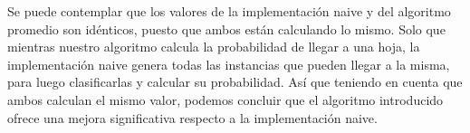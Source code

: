 Se puede contemplar que los valores de la implementación naive y del algoritmo promedio son idénticos, puesto que ambos están calculando lo mismo. Solo que mientras nuestro algoritmo calcula la probabilidad de llegar a una hoja, la implementación naive genera todas las instancias que pueden llegar a la misma, para luego clasificarlas y calcular su probabilidad. Así que teniendo en cuenta que ambos calculan el mismo valor, podemos concluir que el algoritmo introducido ofrece una mejora significativa respecto a la implementación naive. 



